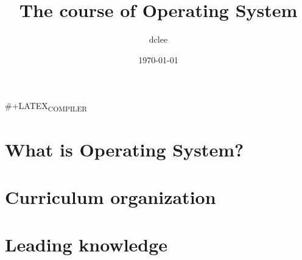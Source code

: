 \documentclass[11pt]{article}
\author{dclee}
\date{\today}
\title{The course of Operating System}
\begin{document}
\maketitle
\tableofcontents

\#+LATEX\textsubscript{COMPILER}
\section{What is Operating System?}
\label{sec:org2a372e8}
\section{Curriculum organization}
\label{sec:org68dc3e0}
\section{Leading knowledge}
\label{sec:org0034678}
\end{document}
